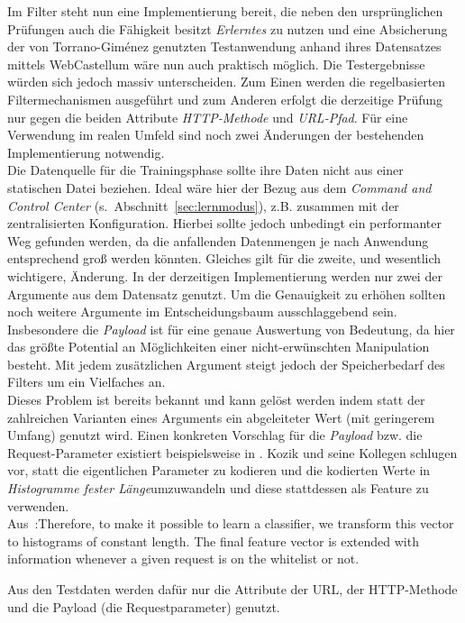 Im Filter steht nun eine Implementierung bereit, die neben den ursprünglichen Prüfungen auch die Fähigkeit besitzt \emph{Erlerntes} zu nutzen und eine Absicherung der von Torrano-Giménez genutzten Testanwendung anhand ihres Datensatzes mittels WebCastellum wäre nun auch praktisch möglich. Die Testergebnisse würden sich jedoch massiv unterscheiden. Zum Einen werden die regelbasierten Filtermechanismen ausgeführt und zum Anderen erfolgt die derzeitige Prüfung nur gegen die beiden Attribute \emph{HTTP-Methode} und \emph{URL-Pfad}. Für eine Verwendung im realen Umfeld sind noch zwei Änderungen der bestehenden Implementierung notwendig.\\
Die Datenquelle für die Trainingsphase sollte ihre Daten nicht aus einer statischen Datei beziehen. Ideal wäre hier der Bezug aus dem \emph{Command and Control Center} (s.~Abschnitt~\ref{sec:lernmodus}), z.B. zusammen mit der zentralisierten Konfiguration. Hierbei sollte jedoch unbedingt ein performanter Weg gefunden werden, da die anfallenden Datenmengen je nach Anwendung entsprechend groß werden könnten. Gleiches gilt für die zweite, und wesentlich wichtigere, Änderung. In der derzeitigen Implementierung werden nur zwei der Argumente aus dem Datensatz genutzt. Um die Genauigkeit zu erhöhen sollten noch weitere Argumente im Entscheidungsbaum ausschlaggebend sein. Insbesondere die \emph{Payload} ist für eine genaue Auswertung von Bedeutung, da hier das größte Potential an Möglichkeiten einer nicht-erwünschten Manipulation besteht. Mit jedem zusätzlichen Argument steigt jedoch der Speicherbedarf des Filters um ein Vielfaches an.\\
Dieses Problem ist bereits bekannt und kann gelöst werden indem statt der zahlreichen Varianten eines Arguments ein abgeleiteter Wert (mit geringerem Umfang) genutzt wird. Einen konkreten Vorschlag für die \emph{Payload} bzw. die Request-Parameter existiert beispielsweise in \cite{kozik2014}. Kozik und seine Kollegen schlugen vor, statt die eigentlichen Parameter zu kodieren und die kodierten Werte in \glqq\emph{Histogramme fester Länge}\grqq umzuwandeln und diese stattdessen als Feature zu verwenden.\\

\textcolor{bhtGray}{ Aus~\cite{kozik2014}:}Therefore, to make it possible to learn a classifier, we transform this vector to histograms of constant length. The final feature vector is extended with information whenever a given request is on the whitelist or not.

Aus den Testdaten werden dafür nur die Attribute der URL, der HTTP-Methode und die Payload (die Requestparameter) genutzt. 

